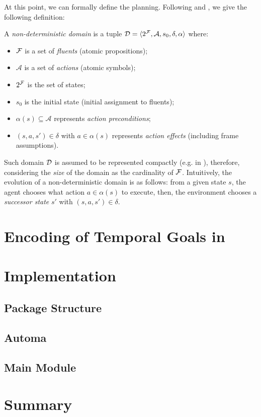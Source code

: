 At this point, we can formally define the \FOND planning. Following \citep{ghallab2004automated} and \citep{geffner2013concise}, we give the following definition:
\begin{definition}
A \textit{non-deterministic domain} is a tuple $\mathcal{D} = \langle 2^{\mathcal{F}}, \mathcal{A}, s_0, \delta, \alpha \rangle$ where:
\begin{itemize}
\item $\mathcal{F}$ is a set of \textit{fluents} (atomic propositions);
\item $\mathcal{A}$ is a set of \textit{actions} (atomic symbols);
\item $2^{\mathcal{F}}$ is the set of states;
\item $s_0$ is the initial state (initial assignment to fluents);
\item $\alpha(s) \subseteq \mathcal{A}$ represents \textit{action preconditions};
\item $(s, a, s') \in \delta$ with $a \in \alpha(s)$ represents \textit{action effects} (including frame assumptions).
\end{itemize}
\end{definition}
\noindent Such domain $\mathcal{D}$ is assumed to be represented compactly (e.g. in \PDDL), therefore, considering the \textit{size} of the domain as the cardinality of $\mathcal{F}$. Intuitively, the evolution of a non-deterministic domain is as follows: from a given state $s$, the agent chooses what action $a \in \alpha(s)$ to execute, then, the environment chooses a \textit{successor state} $s'$ with $(s,a,s') \in \delta$.
  






















\section{Encoding of Temporal Goals in \PDDL}
\section{Implementation}
\subsection{Package Structure}
\subsection{\PDDL}
\subsection{Automa}
\subsection{Main Module}
\section{Summary}
